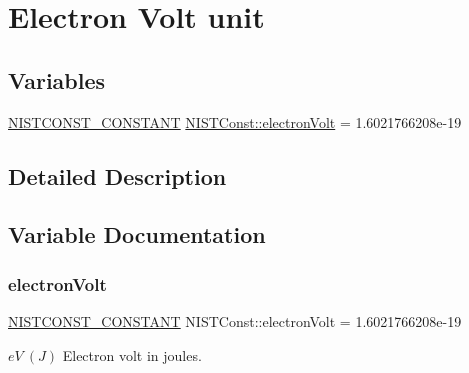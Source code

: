 \hypertarget{group___n_i_s_t_const-_electron_volt_unit}{}\section{Electron Volt unit}
\label{group___n_i_s_t_const-_electron_volt_unit}
\subsection*{Variables}
\begin{DoxyCompactItemize}
\item 
\mbox{\hyperlink{_n_i_s_t_const_8hpp_a2b0fc1d7452373f816175dd86ce26729}{N\+I\+S\+T\+C\+O\+N\+S\+T\+\_\+\+C\+O\+N\+S\+T\+A\+NT}} \mbox{\hyperlink{group___n_i_s_t_const-_electron_volt_unit_ga83756881e375cccc1827b15bd46bdae4}{N\+I\+S\+T\+Const\+::electron\+Volt}} = 1.\+6021766208e-\/19
\end{DoxyCompactItemize}


\subsection{Detailed Description}


\subsection{Variable Documentation}
\mbox{\label{group___n_i_s_t_const-_electron_volt_unit_ga83756881e375cccc1827b15bd46bdae4}} 
\subsubsection{\texorpdfstring{electron\+Volt}{electronVolt}}
{\footnotesize\ttfamily \mbox{\hyperlink{_n_i_s_t_const_8hpp_a2b0fc1d7452373f816175dd86ce26729}{N\+I\+S\+T\+C\+O\+N\+S\+T\+\_\+\+C\+O\+N\+S\+T\+A\+NT}} N\+I\+S\+T\+Const\+::electron\+Volt = 1.\+6021766208e-\/19}

$eV \ (J)$ Electron volt in joules. 